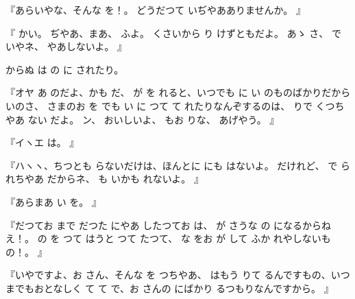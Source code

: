 『あらいやな、そんな
を！。
どうだつて
いぢやあありませんか。
』

『
かい。
ぢやあ、まあ、
ふよ。
くさいから
り
けずともだよ。
あゝ
さ、
で
いやネ、
やあしないよ。
』

からぬ
は
の
に
されたり。

『オヤ
あ
のだよ、かも
だ、
が
を
れると、いつでも
に
い
のものばかりだから
いのさ、
さまのお
を
でも
い
に
つて
て
れたりなんぞするのは、
りで
くつちやあ
ない
だよ。
ン、
おいしいよ、
もお
りな、
あげやう。
』

『イヽエ
は。
』

『ハヽヽ、ちつとも
らないだけは、ほんとに
にも
はないよ。
だけれど、
で
られちやあ
だからネ、
も
いかも
れないよ。
』

『あらまあ
い
を。
』

『だつてお
まで
だつた
にやあ
したつてお
は、
が
さうな
の
になるからねえ！。
の
を
つて
はうと
つて
たつて、
な
をお
が
して
ふか
れやしないもの！。
』

『いやですよ、お
さん、そんな
を
つちやあ、
はもう
りて
るんですもの、いつまでもおとなしく
て
て
で、お
さんの
にばかり
るつもりなんですから。
』

